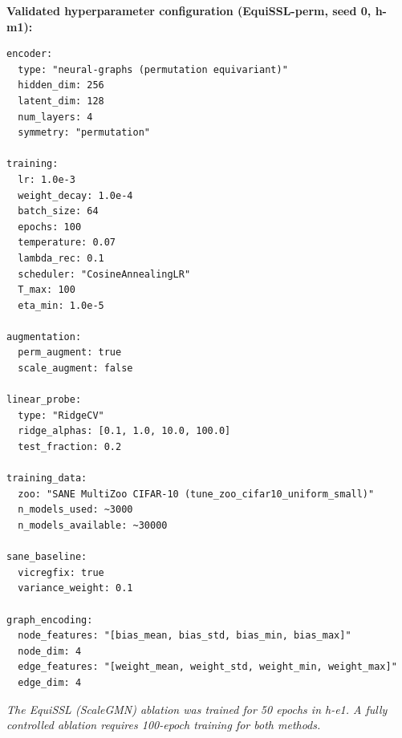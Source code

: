 
\textbf{Validated hyperparameter configuration (EquiSSL-perm, seed 0, h-m1):}

\begin{verbatim}
encoder:
  type: "neural-graphs (permutation equivariant)"
  hidden_dim: 256
  latent_dim: 128
  num_layers: 4
  symmetry: "permutation"

training:
  lr: 1.0e-3
  weight_decay: 1.0e-4
  batch_size: 64
  epochs: 100
  temperature: 0.07
  lambda_rec: 0.1
  scheduler: "CosineAnnealingLR"
  T_max: 100
  eta_min: 1.0e-5

augmentation:
  perm_augment: true
  scale_augment: false

linear_probe:
  type: "RidgeCV"
  ridge_alphas: [0.1, 1.0, 10.0, 100.0]
  test_fraction: 0.2

training_data:
  zoo: "SANE MultiZoo CIFAR-10 (tune_zoo_cifar10_uniform_small)"
  n_models_used: ~3000
  n_models_available: ~30000

sane_baseline:
  vicregfix: true
  variance_weight: 0.1

graph_encoding:
  node_features: "[bias_mean, bias_std, bias_min, bias_max]"
  node_dim: 4
  edge_features: "[weight_mean, weight_std, weight_min, weight_max]"
  edge_dim: 4
\end{verbatim}

\textit{The EquiSSL (ScaleGMN) ablation was trained for 50 epochs in h-e1. A fully controlled ablation requires 100-epoch training for both methods.}
